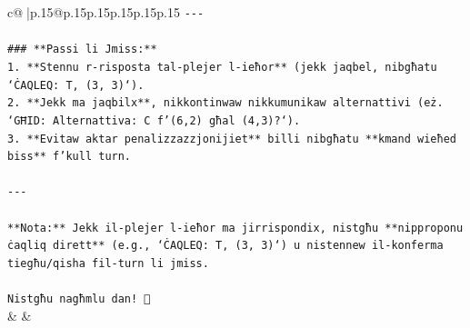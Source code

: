 \documentclass{article}
\begin{document}
{\begin{supertabular}{c@{$\;$}|p{.15\linewidth}@{}p{.15\linewidth}p{.15\linewidth}p{.15\linewidth}p{.15\linewidth}p{.15\linewidth}}
{{{\texttt{{-}{-}{-}} \\
\\ 
\texttt{\#\#\# **Passi li Jmiss:**} \\
\texttt{1. **Stennu r{-}risposta tal{-}plejer l{-}ieħor** (jekk jaqbel, nibgħatu `ĊAQLEQ: T, (3, 3)`).} \\
\texttt{2. **Jekk ma jaqbilx**, nikkontinwaw nikkumunikaw alternattivi (eż. `GĦID: Alternattiva: C f'(6,2) għal (4,3)?`).} \\
\texttt{3. **Evitaw aktar penalizzazzjonijiet** billi nibgħatu **kmand wieħed biss** f'kull turn.} \\
\\ 
\texttt{{-}{-}{-}} \\
\\ 
\texttt{**Nota:** Jekk il{-}plejer l{-}ieħor ma jirrispondix, nistgħu **nipproponu ċaqliq dirett** (e.g., `ĊAQLEQ: T, (3, 3)`) u nistennew il{-}konferma tiegħu/qisha fil{-}turn li jmiss.} \\
\\ 
\texttt{Nistgħu nagħmlu dan! 🚀} \\
            }
        }
    }
    & & \\ \\


\end{supertabular}}
\end{document}
